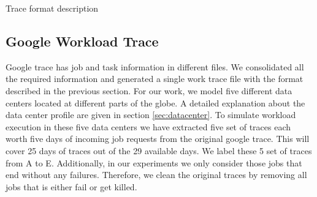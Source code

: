 \documentclass[letterpaper,twocolumn,12pt]{article}
\begin{document}
\begin {table}[]
\centering
    \caption {Trace format description} \label{tab:format} 
\end{table}

\subsection{Google Workload Trace} \label{googletrace}
Google trace has job and task information in different files. We consolidated all the required information and generated a single work trace file with the format described in the previous section. For our work, we model five different data centers located at different parts of the globe. A detailed explanation about the data center profile are given in section \ref{sec:datacenter}. To simulate workload execution in these five data centers we have extracted five set of traces each worth five days of incoming job requests from the original google trace. This will cover 25 days of traces out of the 29 available days. We label these 5 set of traces from A to E. Additionally, in our experiments we only consider those jobs that end without any failures. Therefore, we clean the original traces by removing all jobs that is either fail or get killed. 
\end{document}
